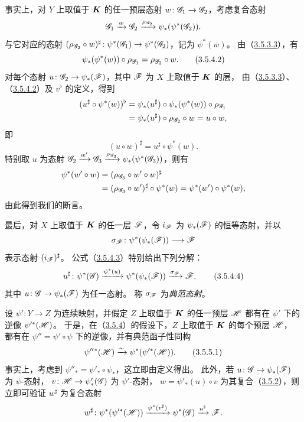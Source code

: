 事实上，对 $Y$ 上取值于 $\boldsymbol K$ 的任一预层态射 $w\colon\mathscr G_1\to\mathscr G_2$，考虑复合态射
\[
 \mathscr G_1\xrightarrow{w}\mathscr G_2\xrightarrow{\rho_{\mathscr G_2}}\psi_*(\psi^*(\mathscr G_2)).
\]
与它对应的态射 $(\rho_{\mathscr G_2}\circ w)^\sharp\colon\psi^*(\mathscr G_1)\to\psi^*(\mathscr G_2)$，记为 $\psi^*(w)$。
由（\hyperref[eq:0:3.5.3.3]{3.5.3.3}），有
\begin{equation}
 \psi_*(\psi^*(w))\circ\rho_{\mathscr G_1}=\rho_{\mathscr G_2}\circ w.
 \tag{3.5.4.2}\label{eq:0:3.5.4.2}
\end{equation}
对每个态射 $u\colon\mathscr G_2\to\psi_*(\mathscr F)$，其中 $\mathscr F$ 为 $X$ 上取值于 $\boldsymbol K$ 的层，
由（\hyperref[eq:0:3.5.3.3]{3.5.3.3}）、（\hyperref[eq:0:3.5.4.2]{3.5.4.2}）及 $v^\flat$ 的定义，得到
\[
 \begin{aligned}
 (u^\sharp\circ\psi^*(w))^\flat
 &=\psi_*(u^\sharp)\circ\psi_*(\psi^*(w))\circ\rho_{\mathscr G_1}\\
 &=\psi_*(u^\sharp)\circ\rho_{\mathscr G_2}\circ w
 =u\circ w,
 \end{aligned}
\]
即
\begin{equation}
 (u\circ w)^\sharp=u^\sharp\circ\psi^*(w).
 \tag{3.5.4.3}\label{eq:0:3.5.4.3}
\end{equation}
特别取 $u$ 为态射 $\mathscr G_2\xrightarrow{w'}\mathscr G_3\xrightarrow{\rho_{\mathscr G_3}}\psi_*(\psi^*(\mathscr G_3))$，则有
\[
 \begin{aligned}
 \psi^*(w'\circ w)
 &=(\rho_{\mathscr G_3}\circ w'\circ w)^\sharp\\
 &=(\rho_{\mathscr G_3}\circ w')^\sharp\circ\psi^*(w)
 =\psi^*(w')\circ\psi^*(w),
 \end{aligned}
\]
由此得到我们的断言。

最后，对 $X$ 上取值于 $\boldsymbol K$ 的任一层 $\mathscr F$，令 $i_\mathscr F$ 为 $\psi_*(\mathscr F)$ 的恒等态射，并以
\[
 \sigma_\mathscr F\colon\psi^*(\psi_*(\mathscr F))\longrightarrow\mathscr F
\]
表示态射 $(i_\mathscr F)^\sharp$。
公式（\hyperref[eq:0:3.5.4.3]{3.5.4.3}）特别给出下列分解：
\begin{equation}
 u^\sharp\colon\psi^*(\mathscr G)\xrightarrow{\psi^*(u)}\psi^*(\psi_*(\mathscr F))
 \xrightarrow{\sigma_\mathscr F}\mathscr F,
 \tag{3.5.4.4}\label{eq:0:3.5.4.4}
\end{equation}
其中 $u\colon\mathscr G\to\psi_*(\mathscr F)$ 为任一态射。
称 $\sigma_\mathscr F$ 为\emph{典范态射}。

设 $\psi'\colon Y\to Z$ 为连续映射，并假定 $Z$ 上取值于 $\boldsymbol K$ 的任一预层 $\mathscr H$
都有在 $\psi'$ 下的逆像 $\psi'^*(\mathscr H)$。
于是，在（\hyperlink{para:0:3.5.4}{3.5.4}）的假设下，$Z$ 上取值于 $\boldsymbol K$ 的每个预层 $\mathscr H$，
都有在 $\psi''=\psi'\circ\psi$ 下的逆像，并有典范函子性同构
\begin{equation}
 \psi''{}^*(\mathscr H)\xrightarrow{\sim}\psi^*(\psi'^*(\mathscr H)).
 \tag{3.5.5.1}\label{eq:0:3.5.5.1}
\end{equation}
事实上，考虑到 $\psi''_*=\psi'_*\circ\psi_*$，这立即由定义得出。
此外，若 $u\colon\mathscr G\to\psi_*(\mathscr F)$ 为 $\psi$-态射，
$v\colon\mathscr H\to\psi'_*(\mathscr G)$ 为 $\psi'$-态射，
$w=\psi'_*(u)\circ v$ 为其复合（\hyperlink{para:0:3.5.2}{3.5.2}），则立即可验证 $w^\sharp$ 为复合态射
\[
 w^\sharp\colon\psi^*(\psi'^*(\mathscr H))
 \xrightarrow{\psi^*(v^\sharp)}\psi^*(\mathscr G)\xrightarrow{u^\sharp}\mathscr F.
\]

